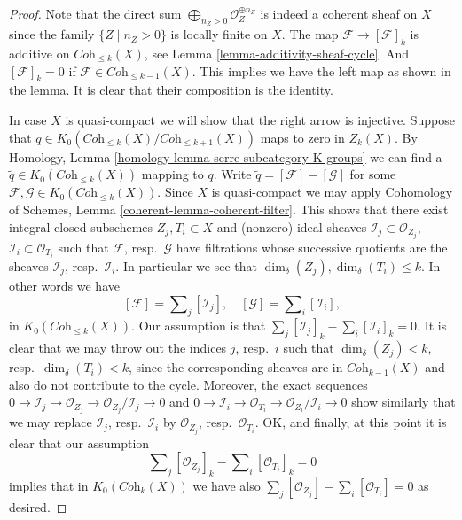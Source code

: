 \begin{proof}
Note that the direct sum
$\bigoplus\nolimits_{n_Z > 0} \mathcal{O}_Z^{\oplus n_Z}$
is indeed a coherent sheaf on $X$ since the family $\{Z \mid n_Z > 0\}$
is locally finite on $X$.
The map $\mathcal{F} \to [\mathcal{F}]_k$ is additive
on $\textit{Coh}_{\leq k}(X)$, see
Lemma \ref{lemma-additivity-sheaf-cycle}. And $[\mathcal{F}]_k = 0$
if $\mathcal{F} \in \textit{Coh}_{\leq k - 1}(X)$.
This implies we have the left map as shown in the lemma.
It is clear that their composition is the identity.

\medskip\noindent
In case $X$ is quasi-compact we will show that the right arrow
is injective.
Suppose that $q \in K_0(\textit{Coh}_{\leq k}(X)/\textit{Coh}_{\leq k + 1}(X))$
maps to zero in $Z_k(X)$. By
Homology, Lemma \ref{homology-lemma-serre-subcategory-K-groups}
we can find
a $\tilde q \in K_0(\textit{Coh}_{\leq k}(X))$ mapping to $q$.
Write $\tilde q = [\mathcal{F}] - [\mathcal{G}]$ for some
$\mathcal{F}, \mathcal{G} \in K_0(\textit{Coh}_{\leq k}(X))$.
Since $X$ is quasi-compact we may apply
Cohomology of Schemes, Lemma \ref{coherent-lemma-coherent-filter}.
This shows that there exist integral closed subschemes
$Z_j, T_i \subset X$ and (nonzero) ideal sheaves
$\mathcal{I}_j \subset \mathcal{O}_{Z_j}$,
$\mathcal{I}_i \subset \mathcal{O}_{T_i}$ such that
$\mathcal{F}$, resp.\ $\mathcal{G}$ have filtrations whose successive
quotients are the sheaves $\mathcal{I}_j$, resp.\ $\mathcal{I}_i$.
In particular we see that $\dim_\delta(Z_j), \dim_\delta(T_i) \leq k$.
In other words we have
$$
[\mathcal{F}] = \sum\nolimits_j [\mathcal{I}_j],
\quad
[\mathcal{G}] = \sum\nolimits_i [\mathcal{I}_i],
$$
in $K_0(\textit{Coh}_{\leq k}(X))$. Our assumption is that
$\sum_j [\mathcal{I}_j]_k - \sum_i [\mathcal{I}_i]_k = 0$.
It is clear that we may throw out the indices $j$, resp.\ $i$
such that $\dim_\delta(Z_j) < k$, resp.\ $\dim_\delta(T_i) < k$,
since the corresponding sheaves are in $\textit{Coh}_{k - 1}(X)$ and
also do not contribute to the cycle. Moreover, the exact sequences
$0 \to \mathcal{I}_j \to \mathcal{O}_{Z_j} \to
\mathcal{O}_{Z_j}/\mathcal{I}_j \to 0$
and
$0 \to \mathcal{I}_i \to \mathcal{O}_{T_i} \to
\mathcal{O}_{Z_i}/\mathcal{I}_i \to 0$
show similarly that we may replace $\mathcal{I}_j$, resp.\ $\mathcal{I}_i$
by $\mathcal{O}_{Z_j}$, resp.\ $\mathcal{O}_{T_i}$.
OK, and finally, at this point it is clear that our assumption
$$
\sum\nolimits_j [\mathcal{O}_{Z_j}]_k - \sum\nolimits_i [\mathcal{O}_{T_i}]_k
= 0
$$
implies that in $K_0(\textit{Coh}_k(X))$ we have also
$\sum\nolimits_j [\mathcal{O}_{Z_j}] - \sum\nolimits_i [\mathcal{O}_{T_i}]
= 0$
as desired.
\end{proof}


